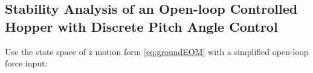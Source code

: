 %
%
%
%
%
%
\subsection{Stability Analysis of an Open-loop Controlled Hopper with Discrete Pitch Angle Control}
Use the state space of z motion form \ref{eq:groundEOM} with a simplified open-loop force input:

